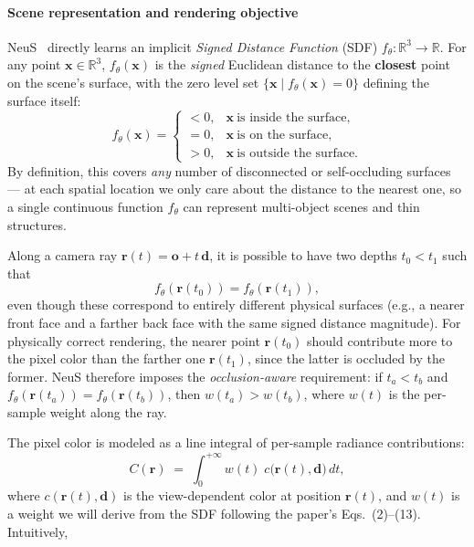 \begin{enrichment}
\begin{enrichment}
        \paragraph{Scene representation and rendering objective}
        NeuS~\cite{wang2021_neus} directly learns an implicit \emph{Signed Distance Function} (SDF) \( f_\theta : \mathbb{R}^3 \rightarrow \mathbb{R} \).  
        For any point \(\mathbf{x} \in \mathbb{R}^3\), \(f_\theta(\mathbf{x})\) is the \emph{signed} Euclidean distance to the \textbf{closest} point on the scene’s surface, with the zero level set \(\{\mathbf{x} \mid f_\theta(\mathbf{x}) = 0\}\) defining the surface itself:
        \[
        f_\theta(\mathbf{x}) =
        \begin{cases}
            < 0, & \mathbf{x} \ \text{is inside the surface}, \\
            = 0, & \mathbf{x} \ \text{is on the surface}, \\
            > 0, & \mathbf{x} \ \text{is outside the surface}.
        \end{cases}
        \]
        By definition, this covers \emph{any} number of disconnected or self-occluding surfaces — at each spatial location we only care about the distance to the nearest one, so a single continuous function \(f_\theta\) can represent multi-object scenes and thin structures.
        
        Along a camera ray \(\mathbf{r}(t) = \mathbf{o} + t\,\mathbf{d}\), it is possible to have two depths \(t_0 < t_1\) such that
        \[
        f_\theta(\mathbf{r}(t_0)) = f_\theta(\mathbf{r}(t_1)),
        \]
        even though these correspond to entirely different physical surfaces (e.g., a nearer front face and a farther back face with the same signed distance magnitude).  
        For physically correct rendering, the nearer point \(\mathbf{r}(t_0)\) should contribute more to the pixel color than the farther one \(\mathbf{r}(t_1)\), since the latter is occluded by the former.  
        NeuS therefore imposes the \emph{occlusion-aware} requirement: if \(t_a < t_b\) and \(f_\theta(\mathbf{r}(t_a)) = f_\theta(\mathbf{r}(t_b))\), then \(w(t_a) > w(t_b)\), where \(w(t)\) is the per-sample weight along the ray.
        
        The pixel color is modeled as a line integral of per-sample radiance contributions:
        \[
        C(\mathbf{r}) \;=\; \int_{0}^{+\infty} w(t)\; c\!\big(\mathbf{r}(t),\mathbf{d}\big)\, dt,
        \]
        where \(c(\mathbf{r}(t),\mathbf{d})\) is the view-dependent color at position \(\mathbf{r}(t)\), and \(w(t)\) is a weight we will derive from the SDF following the paper’s Eqs.~(2)–(13).  
        Intuitively, 
        

\end{enrichment}
\end{enrichment}
